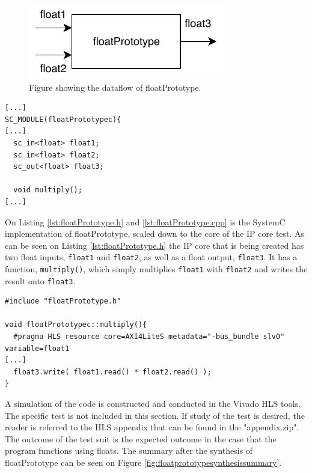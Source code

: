 \begin{figure}[H]
	\centering
	\includegraphics[width=0.5\linewidth]{diagram/floatPrototype}
	\caption{Figure showing the dataflow of floatPrototype.}
	\label{fig:floatprototype}
\end{figure}




\begin{lstlisting}[style=customc++, label={lst:floatPrototype.h}, caption={Simplified view of the header file of floatPrototype.}]
[...]
SC_MODULE(floatPrototypec){
[...]
  sc_in<float> float1;
  sc_in<float> float2;
  sc_out<float> float3;
  
  void multiply();
[...]
\end{lstlisting}

On Listing \ref{lst:floatPrototype.h} and \ref{lst:floatPrototype.cpp} is the SystemC implementation of floatPrototype, scaled down to the core of the IP core test. As can be seen on Listing \ref{lst:floatPrototype.h} the IP core that is being created has two float inputs, \texttt{float1} and \texttt{float2}, as well as a float output, \texttt{float3}. It has a function, \texttt{multiply()}, which simply multiplies \texttt{float1} with \texttt{float2} and writes the result onto \texttt{float3}.

\begin{lstlisting}[style=customc++, label={lst:floatPrototype.cpp}, caption={SystemC file of floatPrototype.}]
#include "floatPrototype.h"

void floatPrototypec::multiply(){
  #pragma HLS resource core=AXI4LiteS metadata="-bus_bundle slv0" variable=float1
[...]
  float3.write( float1.read() * float2.read() );
}
\end{lstlisting}

A simulation of the code is constructed and conducted in the Vivado HLS tools. The specific test is not included in this section. If study of the test is desired, the reader is referred to the HLS appendix that can be found in the "appendix.zip". The outcome of the test suit is the expected outcome in the case that the program functions using floats. The summary after the synthesis of floatPrototype can be seen on Figure \ref{fig:floatprototypesynthesissummary}.\\

